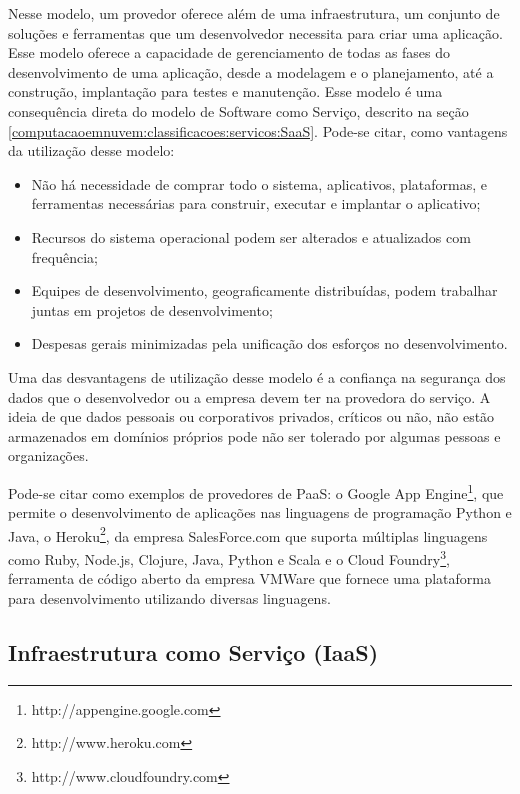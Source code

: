 Nesse modelo, um provedor oferece além de uma infraestrutura, um conjunto de
soluções e ferramentas que um desenvolvedor necessita para criar uma aplicação.
Esse modelo oferece a capacidade de gerenciamento de todas as fases do
desenvolvimento de uma aplicação, desde a modelagem e o planejamento, até a
construção, implantação para testes e manutenção. Esse modelo é uma consequência
direta do modelo de Software como Serviço, descrito na seção
\ref{computacaoemnuvem:classificacoes:servicos:SaaS}. Pode-se citar, como
vantagens da utilização desse modelo:

\begin{itemize}
\setlength{\itemsep}{1pt}
\setlength{\parskip}{0pt}
\setlength{\parsep}{0pt}
\item Não há necessidade de comprar todo o sistema, aplicativos,
plataformas, e ferramentas necessárias para construir, executar e implantar o
aplicativo;
\item Recursos do sistema operacional podem ser alterados e
atualizados com frequência;
\item Equipes de desenvolvimento, geograficamente distribuídas,
podem trabalhar juntas em projetos de desenvolvimento;
\item Despesas gerais minimizadas pela unificação dos esforços no
desenvolvimento.
\end{itemize}

Uma das desvantagens de utilização desse modelo é a confiança na segurança dos
dados que o desenvolvedor ou a empresa devem ter na provedora do serviço. A
ideia de que dados pessoais ou corporativos privados, críticos ou não, não estão
armazenados em domínios próprios pode não ser tolerado por algumas pessoas e
organizações.

Pode-se citar como exemplos de provedores de PaaS: o Google App
Engine\footnote{http://appengine.google.com}, que permite o desenvolvimento de
aplicações nas linguagens de programação Python e Java, o
Heroku\footnote{http://www.heroku.com}, da empresa SalesForce.com que suporta
múltiplas linguagens como Ruby, Node.js, Clojure, Java, Python e Scala e o Cloud
Foundry\footnote{http://www.cloudfoundry.com}, ferramenta de código aberto da
empresa VMWare que fornece uma plataforma para desenvolvimento utilizando
diversas linguagens.

\subsection{Infraestrutura como Serviço (IaaS)} 
\label{computacaoemnuvem:classificacoes:servicos:IaaS}

